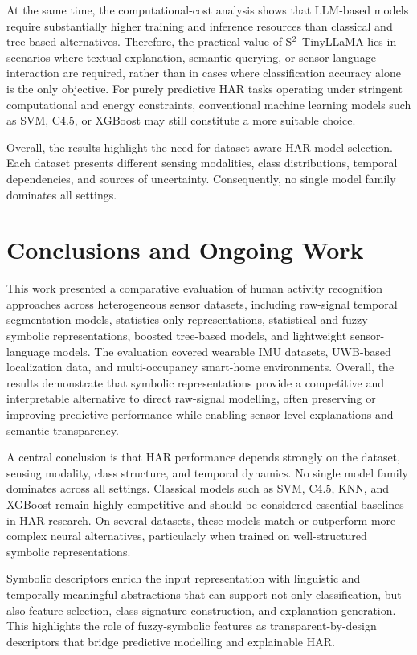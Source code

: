 \documentclass[preprint,12pt]{elsarticle}
\begin{document}
At the same time, the computational-cost analysis shows that LLM-based models require substantially higher training and inference resources than classical and tree-based alternatives. Therefore, the practical value of S$^2$--TinyLLaMA lies in scenarios where textual explanation, semantic querying, or sensor-language interaction are required, rather than in cases where classification accuracy alone is the only objective. For purely predictive HAR tasks operating under stringent computational and energy constraints, conventional machine learning models such as SVM, C4.5, or XGBoost may still constitute a more suitable choice.

Overall, the results highlight the need for dataset-aware HAR model selection. Each dataset presents different sensing modalities, class distributions, temporal dependencies, and sources of uncertainty. Consequently, no single model family dominates all settings.

\section{Conclusions and Ongoing Work}
\label{sec:conclusion}

This work presented a comparative evaluation of human activity recognition approaches across heterogeneous sensor datasets, including raw-signal temporal segmentation models, statistics-only representations, statistical and fuzzy-symbolic representations, boosted tree-based models, and lightweight sensor-language models. The evaluation covered wearable IMU datasets, UWB-based localization data, and multi-occupancy smart-home environments. Overall, the results demonstrate that symbolic representations provide a competitive and interpretable alternative to direct raw-signal modelling, often preserving or improving predictive performance while enabling sensor-level explanations and semantic transparency.

A central conclusion is that HAR performance depends strongly on the dataset, sensing modality, class structure, and temporal dynamics. No single model family dominates across all settings. Classical models such as SVM, C4.5, KNN, and XGBoost remain highly competitive and should be considered essential baselines in HAR research. On several datasets, these models match or outperform more complex neural alternatives, particularly when trained on well-structured symbolic representations.

Symbolic descriptors enrich the input representation with linguistic and temporally meaningful abstractions that can support not only classification, but also feature selection, class-signature construction, and explanation generation. This highlights the role of fuzzy-symbolic features as transparent-by-design descriptors that bridge predictive modelling and explainable HAR.
\end{document}
